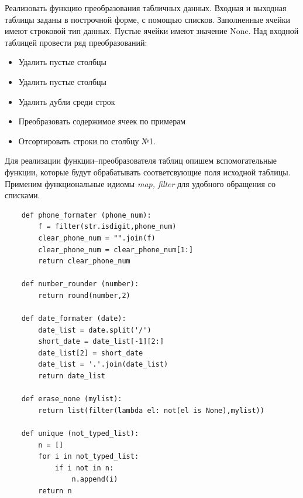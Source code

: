 \documentclass[a4paper,14pt]{extarticle}
\begin{document}
\begin{problem}
	Реализовать функцию преобразования табличных данных. Входная и выходная таблицы
	заданы в построчной форме, с помощью списков. Заполненные ячейки имеют строковой тип
	данных. Пустые ячейки имеют значение None.
	Над входной таблицей провести ряд преобразований:
	\begin{itemize}
		\item Удалить пустые столбцы
		\item Удалить пустые столбцы
		\item Удалить дубли среди строк
		\item Преобразовать содержимое ячеек по примерам
		\item Отсортировать строки по столбцу №1.
	\end{itemize}
\begin{nonum}
	Для реализации функции--преобразователя таблиц опишем вспомогательные функции, которые будут обрабатывать соответсвующие поля исходной таблицы. Применим функциональные идиомы \textit{map, filter} для удобного обращения со списками.
	\begin{lstlisting}
	def phone_formater (phone_num):
		f = filter(str.isdigit,phone_num)
		clear_phone_num = "".join(f)
		clear_phone_num = clear_phone_num[1:]
		return clear_phone_num
	
	def number_rounder (number):
		return round(number,2)
	
	def date_formater (date):
		date_list = date.split('/')
		short_date = date_list[-1][2:]
		date_list[2] = short_date
		date_list = '.'.join(date_list)
		return date_list
	
	def erase_none (mylist):
		return list(filter(lambda el: not(el is None),mylist))
	
	def unique (not_typed_list):
		n = []
		for i in not_typed_list:
			if i not in n:
				n.append(i)
		return n
		

\end{lstlisting}
\end{nonum}
\end{problem}
\end{document}
